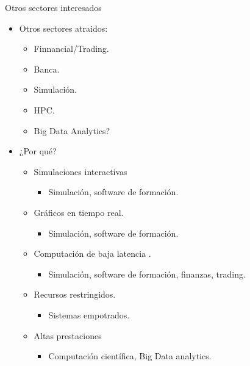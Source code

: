 \begin{frame}[t,shrink=10]{Otros sectores interesados}
\begin{itemize}
  \item Otros sectores atraidos:
    \begin{itemize}
      \item Finnancial/Trading.
      \item Banca.
      \item Simulación.
      \item HPC.
      \item Big Data Analytics?
    \end{itemize}
  \vfill\pause
  \item ¿Por qué?
    \begin{itemize}
      \item Simulaciones interactivas 
        \begin{itemize}
          \item Simulación, software de formación.
        \end{itemize}
      \item Gráficos en tiempo real.
        \begin{itemize}
          \item Simulación, software de formación.
        \end{itemize}
      \item Computación de baja latencia .
        \begin{itemize}
          \item Simulación, software de formación, finanzas, trading.
        \end{itemize}
      \item Recursos restringidos. 
        \begin{itemize}
          \item Sistemas empotrados.
        \end{itemize}
      \item Altas prestaciones 
        \begin{itemize}
          \item Computación científica, Big Data analytics.
        \end{itemize}
    \end{itemize}
\end{itemize}
\end{frame}
